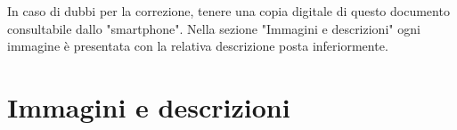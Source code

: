 \documentclass[hidelinks,12pt,a4paper]{article}
\begin{document}
	\vspace*{\fill}
	\centering
	\fboxrule=2pt
	\fbox
	{
		\begin{minipage}{\linewidth}
			In caso di dubbi per la correzione, tenere una copia digitale di questo documento consultabile dallo "smartphone". Nella sezione "Immagini e descrizioni" ogni immagine è presentata con la relativa descrizione posta inferiormente.
		\end{minipage}
	 }
	
	\newpage
	\section{Immagini e descrizioni}
	
	\begin{figure}[h]
			\centering
	\end{figure}
\end{document}
